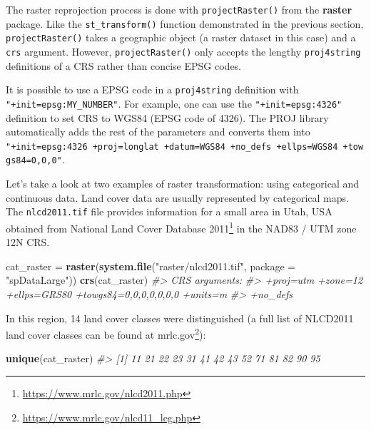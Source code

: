 \documentclass[]{krantz}
\newenvironment{Shaded}{\begin{snugshade}}{\end{snugshade}}
\newcommand{\CommentTok}[1]{\textcolor[rgb]{0.37,0.37,0.37}{\textit{#1}}}
\newcommand{\DataTypeTok}[1]{\textcolor[rgb]{0.27,0.27,0.27}{#1}}
\newcommand{\KeywordTok}[1]{\textcolor[rgb]{0.27,0.27,0.27}{\textbf{#1}}}
\newcommand{\NormalTok}[1]{#1}
\newcommand{\StringTok}[1]{\textcolor[rgb]{0.5,0.5,0.5}{#1}}
\let\rmarkdownfootnote\footnote%
\def\footnote{\protect\rmarkdownfootnote}
\renewcommand{\href}[2]{#2\footnote{\url{#1}}}
\let\BeginKnitrBlock\begin \let\EndKnitrBlock\end
\begin{document}
The raster reprojection process is done with \texttt{projectRaster()} from the \textbf{raster} package.
Like the \texttt{st\_transform()} function demonstrated in the previous section, \texttt{projectRaster()} takes a geographic object (a raster dataset in this case) and a \texttt{crs} argument.
However, \texttt{projectRaster()} only accepts the lengthy \texttt{proj4string} definitions of a CRS rather than concise EPSG codes.

\BeginKnitrBlock{rmdnote}
It is possible to use a EPSG code in a \texttt{proj4string} definition with \texttt{"+init=epsg:MY\_NUMBER"}.
For example, one can use the \texttt{"+init=epsg:4326"} definition to set CRS to WGS84 (EPSG code of 4326).
The PROJ library automatically adds the rest of the parameters and converts them into \texttt{"+init=epsg:4326\ +proj=longlat\ +datum=WGS84\ +no\_defs\ +ellps=WGS84\ +towgs84=0,0,0"}.
\EndKnitrBlock{rmdnote}

Let's take a look at two examples of raster transformation: using categorical and continuous data.
Land cover data are usually represented by categorical maps.
The \texttt{nlcd2011.tif} file provides information for a small area in Utah, USA obtained from \href{https://www.mrlc.gov/nlcd2011.php}{National Land Cover Database 2011} in the NAD83 / UTM zone 12N CRS.

\begin{Shaded}
\begin{Highlighting}[]
\NormalTok{cat_raster =}\StringTok{ }\KeywordTok{raster}\NormalTok{(}\KeywordTok{system.file}\NormalTok{(}\StringTok{"raster/nlcd2011.tif"}\NormalTok{, }\DataTypeTok{package =} \StringTok{"spDataLarge"}\NormalTok{))}
\KeywordTok{crs}\NormalTok{(cat_raster)}
\CommentTok{#> CRS arguments:}
\CommentTok{#>  +proj=utm +zone=12 +ellps=GRS80 +towgs84=0,0,0,0,0,0,0 +units=m}
\CommentTok{#> +no_defs}
\end{Highlighting}
\end{Shaded}

In this region, 14 land cover classes were distinguished (a full list of NLCD2011 land cover classes can be found at \href{https://www.mrlc.gov/nlcd11_leg.php}{mrlc.gov}):

\begin{Shaded}
\begin{Highlighting}[]
\KeywordTok{unique}\NormalTok{(cat_raster)}
\CommentTok{#>  [1] 11 21 22 23 31 41 42 43 52 71 81 82 90 95}
\end{Highlighting}
\end{Shaded}
\end{document}
